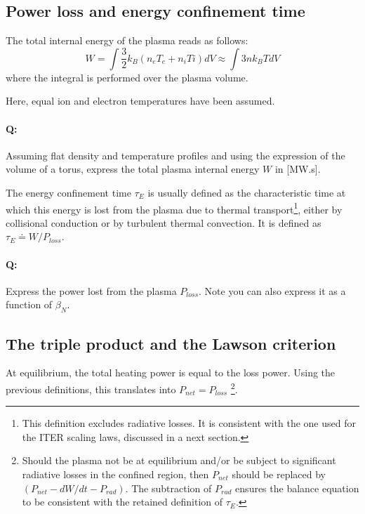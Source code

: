 \subsection{Power loss and energy confinement time}

The total internal energy of the plasma reads as follows:
\begin{equation*}
  W  = \int \frac{3}{2} k_B \left( n_e T_e + n_i Ti \right ) dV 
  \approx \int 3 n k_BT dV
\end{equation*}
where the integral is performed over the plasma volume. 

Here, equal ion and electron temperatures have been assumed. 

\paragraph{Q:} Assuming flat density and temperature profiles and using the expression of the volume of a torus, express the total plasma internal energy $W$ in [MW.s].



The energy confinement time $\tau_E$ is usually defined as the characteristic time at which this energy is lost from the plasma due to thermal transport\footnote{This definition excludes radiative losses. It is consistent with the one used for the ITER scaling laws, discussed in a next section.}, either by collisional conduction or by turbulent thermal convection. It is defined as $\tau_E \doteq W/P_{loss}$. 

\paragraph{Q:} Express the power lost from the plasma $P_{loss}$. Note you can also express it as a function of $\beta_N$.


\subsection{The triple product and the Lawson criterion}
At equilibrium, the total heating power is equal to the loss power. Using the previous definitions, this translates into $P_{net} =P_{loss}$ \footnote{Should the plasma not be at equilibrium and/or be subject to significant radiative losses in the confined region, then $P_{net}$ should be replaced by $(P_{net}-dW/dt-P_{rad})$. The subtraction of $P_{rad}$ ensures the balance equation to be consistent with the retained definition of $\tau_E$.}.


